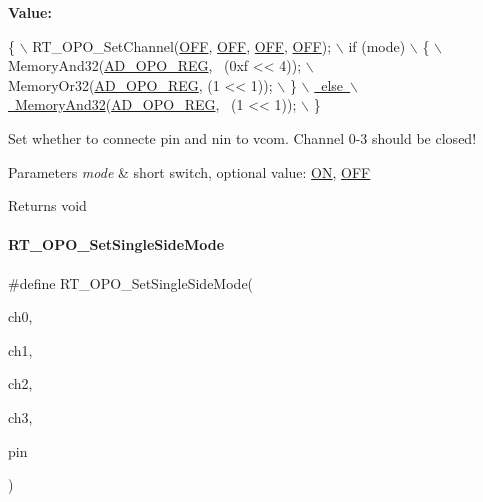 {\bfseries Value\+:}
\begin{DoxyCode}
\{                                             \(\backslash\)
        RT\_OPO\_SetChannel(\mbox{\hyperlink{a00020_a29e413f6725b2ba32d165ffaa35b01e5}{OFF}}, \mbox{\hyperlink{a00020_a29e413f6725b2ba32d165ffaa35b01e5}{OFF}}, \mbox{\hyperlink{a00020_a29e413f6725b2ba32d165ffaa35b01e5}{OFF}}, \mbox{\hyperlink{a00020_a29e413f6725b2ba32d165ffaa35b01e5}{OFF}});    \(\backslash\)
        if (mode)                                 \(\backslash\)
        \{                                         \(\backslash\)
            MemoryAnd32(\mbox{\hyperlink{a00020_adadaa0ab1ebbd7ba9b70dfd24c3ed44da6dc7e2b1252e5ac208ae78d9c46e8e7e}{AD\_OPO\_REG}}, ~(0xf << 4)); \(\backslash\)
            MemoryOr32(\mbox{\hyperlink{a00020_adadaa0ab1ebbd7ba9b70dfd24c3ed44da6dc7e2b1252e5ac208ae78d9c46e8e7e}{AD\_OPO\_REG}}, (1 << 1));     \(\backslash\)
        \}                                         \mbox{\hyperlink{a00020_ad87cedffcaadc51db22594fce55173d4}{\(\backslash\)}}
\mbox{\hyperlink{a00020_ad87cedffcaadc51db22594fce55173d4}{        else                                      \(\backslash\)}}
\mbox{\hyperlink{a00020_ad87cedffcaadc51db22594fce55173d4}{            MemoryAnd32}}(\mbox{\hyperlink{a00020_adadaa0ab1ebbd7ba9b70dfd24c3ed44da6dc7e2b1252e5ac208ae78d9c46e8e7e}{AD\_OPO\_REG}}, ~(1 << 1));   \(\backslash\)
    \}
\end{DoxyCode}


Set whether to connecte pin and nin to vcom. Channel 0-\/3 should be closed! 


\begin{DoxyParams}{Parameters}
{\em mode} & short switch, optional value\+: \mbox{\hyperlink{a00020_ad76d1750a6cdeebd506bfcd6752554d2}{ON}}, \mbox{\hyperlink{a00020_a29e413f6725b2ba32d165ffaa35b01e5}{O\+FF}} \\
\hline
\end{DoxyParams}
\begin{DoxyReturn}{Returns}
void 
\end{DoxyReturn}
\mbox{\label{a00002_a6438defc0d6280f2b5baedc039f2e314}} 
\paragraph{\texorpdfstring{R\+T\+\_\+\+O\+P\+O\+\_\+\+Set\+Single\+Side\+Mode}{RT\_OPO\_SetSingleSideMode}}
{\footnotesize\ttfamily \#define R\+T\+\_\+\+O\+P\+O\+\_\+\+Set\+Single\+Side\+Mode(\begin{DoxyParamCaption}\item[{}]{ch0,  }\item[{}]{ch1,  }\item[{}]{ch2,  }\item[{}]{ch3,  }\item[{}]{pin }\end{DoxyParamCaption})}

